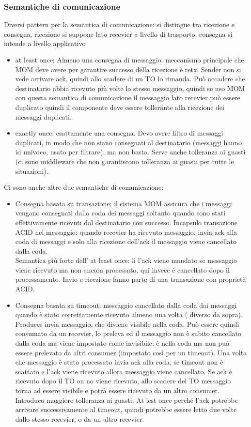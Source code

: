 \documentclass[16px]{article}
\begin{document}
\subsubsection{Semantiche di comunicazione}
Diversi pattern per la semantica di comunicazione: si distingue tra ricezione e consegna, ricezione si suppone lato recevier a livello di trasporto, consegna si intende a livello applicativo
\begin{itemize}
\item at least once: Almeno una consegna di messaggio. meccanismo principale che MOM deve avere per garantire successo della ricezione è retx. Sender non si vede arrivare ack, quindi allo scadere di un TO lo rimanda. Può accadere che destinatario abbia ricevuto più volte lo stesso messaggio, quindi se uso MOM con questa semantica di comunicazione il messaggio lato recevier può essere duplicato quindi il componente deve essere tollerante alla ricezione dei messaggi duplicati.
\item exactly once: esattamente una consegna. Devo avere filtro di messaggi duplicati, in modo che non siano consegnati al destinatario (messaggi hanno id univoco, usato per filtrare), ma non basta. Serve anche tolleranza ai guasti (ci sono middleware che non garantiscono tolleranza ai guasti per tutte le situazioni).
\end{itemize}
Ci sono anche altre due semantiche di comunicazione:
\begin{itemize}
\item Consegna basata su transazione: il sistema MOM assicura che i messaggi vengano consegnati dalla coda dei messaggi soltanto quando sono stati effettivamente ricevuti dal destinatario con successo. Incapsulo transazione ACID nel messaggio: quando recevier ha ricevuto messaggio, invia ack alla coda di messaggi e solo alla ricezione dell'ack il messaggio viene cancellato dalla coda.\\ Semantica più forte dell' at least once: lì l'ack viene mandato se messaggio viene ricevuto ma non ancora processato, qui invece è cancellato dopo il processamento. Invio e ricezione fanno parte di una transazione con proprietà ACID.
\item Consegna basata su timeout: messaggio cancellato dalla coda dai messaggi quando è stato correttamente ricevuto almeno una volta ( diverso da sopra). Producer invia messaggio, che diviene visibile nella coda. Può essere quindi consumato da un recevier, lo preleva ed il messaggio non è subito cancellato dalla coda ma viene impostato come invisibile: è nella coda ma non può essere prelevato da altri consumer (impostato così per un timeout). Una volta che messaggio è stato processato invia ack alla coda, se timeout non è scattato e l'ack viene ricevuto allora messaggio viene cancellato. Se ack è ricevuto dopo il TO on no viene ricevuto, allo scadere del TO messaggio torna ad essere visibile e potrà essere ricevuto da un altro consumer. Introduco maggiore tolleranza ai guasti. At lest once perché l'ack potrebbe arrivare successivamente al timeout, quindi potrebbe essere letto due volte dallo stesso recevier, o da un altro recevier.
\end{itemize}
\end{document}

